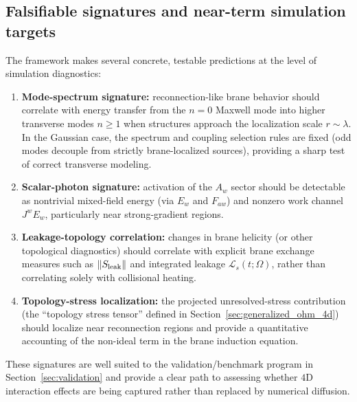 \documentclass[11pt]{article}
\newcommand{\Sleak}{S_{\rm leak}}
\begin{document}
\subsection{Falsifiable signatures and near-term simulation targets}
The framework makes several concrete, testable predictions at the level of simulation
diagnostics:
\begin{enumerate}[leftmargin=1.6em]
\item \textbf{Mode-spectrum signature:} reconnection-like brane behavior should correlate with
energy transfer from the \(n=0\) Maxwell mode into higher transverse modes \(n\ge 1\) when
structures approach the localization scale \(r\sim\lambda\). In the Gaussian case, the
spectrum and coupling selection rules are fixed (odd modes decouple from strictly brane-localized
sources), providing a sharp test of correct transverse modeling.

\item \textbf{Scalar-photon signature:} activation of the \(A_w\) sector should be detectable as
nontrivial mixed-field energy (via \(E_w\) and \(F_{aw}\)) and nonzero work channel \(J^wE_w\),
particularly near strong-gradient regions.

\item \textbf{Leakage-topology correlation:} changes in brane helicity (or other topological
diagnostics) should correlate with explicit brane exchange measures such as \(\|\Sleak\|\) and
integrated leakage \(\mathcal{L}_s(t;\Omega)\), rather than correlating solely with collisional
heating.

\item \textbf{Topology-stress localization:} the projected unresolved-stress contribution (the
``topology stress tensor'' defined in Section~\ref{sec:generalized_ohm_4d}) should localize
near reconnection regions and provide a quantitative accounting of the non-ideal term in the
brane induction equation.
\end{enumerate}
These signatures are well suited to the validation/benchmark program in
Section~\ref{sec:validation} and provide a clear path to assessing whether \(4\)D
interaction effects are being captured rather than replaced by numerical diffusion.
\end{document}
